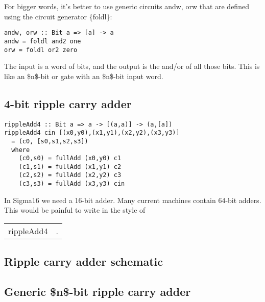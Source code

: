 \documentclass[11pt]{article}
\begin{document}
For bigger words, it's better to use generic circuits andw, orw that
are defined using the circuit generator \{\color{red}foldl\}:

\begin{verbatim}
andw, orw :: Bit a => [a] -> a
andw = foldl and2 one
orw = foldl or2 zero
\end{verbatim}

The input is a word of bits, and the output is the and/or of all those
bits.  This is like an \$n\$-bit or gate with an \$n\$-bit input word.

\subsection{4-bit ripple carry adder}
\label{sec:org71330bc}

\begin{verbatim}
rippleAdd4 :: Bit a => a -> [(a,a)] -> (a,[a])
rippleAdd4 cin [(x0,y0),(x1,y1),(x2,y2),(x3,y3)]
  = (c0, [s0,s1,s2,s3])
  where
    (c0,s0) = fullAdd (x0,y0) c1
    (c1,s1) = fullAdd (x1,y1) c2
    (c2,s2) = fullAdd (x2,y2) c3
    (c3,s3) = fullAdd (x3,y3) cin
\end{verbatim}

In Sigma16 we need a 16-bit adder.  Many current machines contain
64-bit adders.  This would be painful to write in the style of
\begin{center}
\begin{tabular}{ll}
rippleAdd4 & .\\[0pt]
\end{tabular}
\end{center}

\subsection{Ripple carry adder schematic}
\label{sec:org699c1a7}

\subsection{Generic \$n\$-bit ripple carry adder}
\label{sec:orge47eccf}
\end{document}
